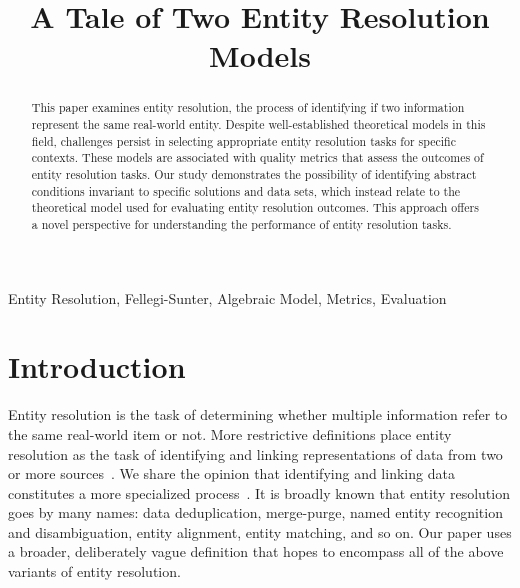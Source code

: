 \documentclass[journal]{IEEEtran}
\begin{document}
    \title{A Tale of Two Entity Resolution Models}
    \author{
    }

    \maketitle

    \theoremstyle{definition}
    \newtheorem{defn}{Definition}[section]
    
    \maketitle
    \begin{abstract}
        This paper examines entity resolution, the process of identifying if two
        information represent the same real-world entity.
        Despite well-established theoretical models in this field, challenges
        persist in selecting appropriate entity resolution tasks for specific
        contexts.
        These models are associated with quality metrics that assess the
        outcomes of entity resolution tasks.
        Our study demonstrates the possibility of identifying abstract
        conditions invariant to specific solutions and data sets, which instead
        relate to the theoretical model used for evaluating entity resolution
        outcomes.
        This approach offers a novel perspective for understanding the
        performance of entity resolution tasks.
    \end{abstract}

    \begin{IEEEkeywords}
        Entity Resolution, Fellegi-Sunter, Algebraic Model, Metrics, Evaluation
    \end{IEEEkeywords}

    \section{Introduction}\label{sec:Introduction}
    Entity resolution is the task of determining whether multiple information
    refer to the same real-world item or not.
    More restrictive definitions place entity resolution as the task of
    identifying and linking representations of data from two or more
    sources~\cite{Qia17}.
    We share the opinion that identifying and linking data constitutes a more
    specialized process~\cite{Tal11}.
    It is broadly known that entity resolution goes by many names: data
    deduplication, merge-purge, named entity recognition and disambiguation,
    entity alignment, entity matching, and so on.
    Our paper uses a broader, deliberately vague definition that hopes to
    encompass all of the above variants of entity resolution.
    
\end{document}
